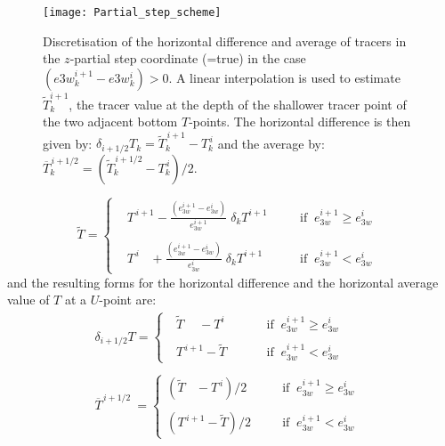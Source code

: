 \documentclass[NEMO_book]{subfiles}
\begin{document}
\begin{figure}[!p] 	 \begin{center}
\texttt{[image: Partial\_step\_scheme]}
\caption{ 	\label{Fig_Partial_step_scheme} 
Discretisation of the horizontal difference and average of tracers in the $z$-partial 
step coordinate (=true) in the case $( e3w_k^{i+1} - e3w_k^i  )>0$. 
A linear interpolation is used to estimate $\widetilde{T}_k^{i+1}$, the tracer value 
at the depth of the shallower tracer point of the two adjacent bottom $T$-points. 
The horizontal difference is then given by: $\delta _{i+1/2} T_k=  \widetilde{T}_k^{\,i+1} -T_k^{\,i}$ 
and the average by: $\overline{T}_k^{\,i+1/2}= ( \widetilde{T}_k^{\,i+1/2} - T_k^{\,i} ) / 2$.  }
\end{center}   \end{figure}
\begin{equation*}
\widetilde{T}= \left\{  \begin{aligned}  
&T^{\,i+1}      -\frac{ \left( e_{3w}^{i+1} -e_{3w}^i \right)}{ e_{3w}^{i+1} }\;\delta _k T^{i+1}	
 								&& \quad\text{if  $\ e_{3w}^{i+1} \geq e_{3w}^i$   } 	\\
										\\
&T^{\,i} \ \ \ \,+\frac{ \left( e_{3w}^{i+1} -e_{3w}^i \right) }{e_{3w}^i       }\;\delta _k T^{i+1}
			 					&& \quad\text{if  $\ e_{3w}^{i+1}    <   e_{3w}^i$   } 
            \end{aligned}   \right.
\end{equation*}
and the resulting forms for the horizontal difference and the horizontal average 
value of $T$ at a $U$-point are: 
\begin{equation} \label{Eq_zps_hde}
\begin{aligned}
 \delta _{i+1/2} T= 	\begin{cases}
\ \ \ \widetilde {T}\quad\ -T^i	 	& \ \ \quad\quad\text{if  $\ e_{3w}^{i+1} \geq e_{3w}^i$ } \\
										\\
\ \ \ T^{\,i+1}-\widetilde{T}		& \ \ \quad\quad\text{if  $\ e_{3w}^{i+1}    <   e_{3w}^i$   } 
            		\end{cases}     \\
\\
\overline {T}^{\,i+1/2} \ = 	\begin{cases}
( \widetilde {T}\ \ \;\,-T^{\,i})	 / 2	& \;\ \ \quad\text{if  $\ e_{3w}^{i+1} \geq e_{3w}^i$ } \\
										\\
( T^{\,i+1}-\widetilde{T} ) / 2		& \;\ \ \quad\text{if  $\ e_{3w}^{i+1}    <   e_{3w}^i$   } 
            \end{cases}
\end{aligned}
\end{equation}
\end{document}
